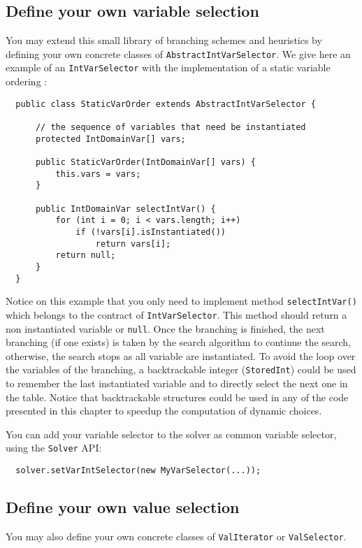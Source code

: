 \subsection{Define your own variable selection}\label{advanced:defineyourownvariableselection}\hypertarget{advanced:defineyourownvariableselection}{}
You may extend this small library of branching schemes and heuristics by defining your own concrete classes of \texttt{AbstractIntVarSelector}. We give here an example of an \texttt{IntVarSelector} with the implementation of a static variable ordering :
\begin{lstlisting}
  public class StaticVarOrder extends AbstractIntVarSelector {

      // the sequence of variables that need be instantiated
	  protected IntDomainVar[] vars;
	
	  public StaticVarOrder(IntDomainVar[] vars) {
          this.vars = vars;
	  }
	
	  public IntDomainVar selectIntVar() {
          for (int i = 0; i < vars.length; i++)
              if (!vars[i].isInstantiated())
                  return vars[i];
          return null;
	  }
  }
\end{lstlisting}

Notice on this example that you only need to implement method \texttt{selectIntVar()} which belongs to the contract of \texttt{IntVarSelector}. This method should return a non instantiated variable or \texttt{null}. Once the branching is finished, the next branching (if one exists) is taken by the search algorithm to continue the search, otherwise, the search stops as all variable are instantiated. To avoid the loop over the variables of the branching, a backtrackable integer (\texttt{StoredInt}) could be used to remember the last instantiated variable and to directly select the next one in the table. Notice that backtrackable structures could be used in any of the code presented in this chapter to speedup the computation of dynamic choices.

You can add your variable selector to the solver as common variable selector, using the \texttt{Solver} API:
\begin{lstlisting}
  solver.setVarIntSelector(new MyVarSelector(...));
\end{lstlisting}

\subsection{Define your own value selection}\label{advanced:defineyourownvalueselection}\hypertarget{advanced:defineyourownvalueselection}{}
You may also define your own concrete classes of \texttt{ValIterator} or \texttt{ValSelector}. 

